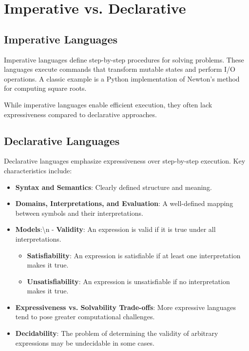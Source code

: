 \documentclass{book}
\providecommand{\tightlist}{%
  \setlength{\itemsep}{0pt}\setlength{\parskip}{0pt}}
\begin{document}
\hypertarget{pandoc.profile.debug__pandoc__debug__src__languages.md__imperative-vs-declarative}{%
\section*{Imperative vs. Declarative}\label{pandoc.profile.debug__pandoc__debug__src__languages.md__imperative-vs-declarative}}

\hypertarget{pandoc.profile.debug__pandoc__debug__src__languages.md__imperative-languages}{%
\subsection*{Imperative Languages}\label{pandoc.profile.debug__pandoc__debug__src__languages.md__imperative-languages}}

Imperative languages define step-by-step procedures for solving problems. These languages execute commands that transform mutable states and perform I/O operations. A classic example is a Python implementation of Newton's method for computing square roots.

While imperative languages enable efficient execution, they often lack expressiveness compared to declarative approaches.

\hypertarget{pandoc.profile.debug__pandoc__debug__src__languages.md__declarative-languages}{%
\subsection*{Declarative Languages}\label{pandoc.profile.debug__pandoc__debug__src__languages.md__declarative-languages}}

Declarative languages emphasize expressiveness over step-by-step execution. Key characteristics include:

\begin{itemize}
\tightlist
\item
  \textbf{Syntax and Semantics}: Clearly defined structure and meaning.
\item
  \textbf{Domains, Interpretations, and Evaluation}: A well-defined mapping between symbols and their interpretations.
\item
  \textbf{Models}:\textbackslash n  - \textbf{Validity}: An expression is valid if it is true under all interpretations.

  \begin{itemize}
  \tightlist
  \item
    \textbf{Satisfiability}: An expression is satisfiable if at least one interpretation makes it true.
  \item
    \textbf{Unsatisfiability}: An expression is unsatisfiable if no interpretation makes it true.
  \end{itemize}
\item
  \textbf{Expressiveness vs. Solvability Trade-offs}: More expressive languages tend to pose greater computational challenges.
\item
  \textbf{Decidability}: The problem of determining the validity of arbitrary expressions may be undecidable in some cases.
\end{itemize}
\end{document}
